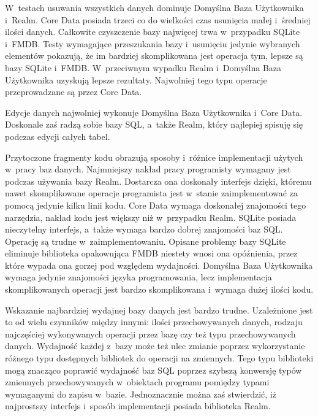  W~testach usuwania wszystkich danych dominuje Domyślna Baza Użytkownika i~Realm. Core Data posiada trzeci co do wielkości czas usunięcia małej i~średniej ilości danych. Całkowite czyszczenie bazy najwięcej trwa w~przypadku SQLite i~FMDB.  Testy wymagające przeszukania bazy i~usunięciu jedynie wybranych elementów pokazują, że im bardziej skomplikowana jest operacja tym, lepsze są bazy SQLite i~FMDB. W~przeciwnym wypadku Realm i~Domyślna Baza Użytkownika uzyskują lepsze rezultaty. Najwolniej tego typu operacje przeprowadzane są przez Core Data. 

Edycje danych najwolniej wykonuje Domyślna Baza Użytkownika i~Core Data. Doskonale zaś radzą sobie bazy SQL, a~także Realm, który najlepiej spisuję się podczas edycji całych tabel. 

Przytoczone fragmenty kodu obrazują sposoby i~różnice implementacji użytych w~pracy baz danych. Najmniejszy nakład pracy programisty wymagany jest podczas używania bazy Realm. Dostarcza ona doskonały interfejs dzięki, któremu nawet skomplikowane operacje programista jest w~stanie zaimplementować za pomocą jedynie kilku linii kodu. Core Data wymaga doskonałej znajomości tego narzędzia, nakład kodu jest większy niż w~przypadku Realm. SQLite posiada nieczytelny interfejs, a~także wymaga bardzo dobrej znajomości baz SQL. Operację są trudne w~zaimplementowaniu. Opisane problemy bazy SQLite eliminuje biblioteka opakowująca FMDB niestety wnosi ona opóźnienia, przez które wypada ona gorzej pod względem wydajności. Domyślna Baza Użytkownika wymaga jedynie znajomości języka programowania, lecz implementacja skomplikowanych operacji jest bardzo skomplikowana i~wymaga dużej ilości kodu. 

Wskazanie najbardziej wydajnej bazy danych jest bardzo trudne. Uzależnione jest to od wielu czynników między innymi: ilości przechowywanych danych, rodzaju najczęściej wykonywanych operacji przez bazę czy też typu przechowywanych danych. Wydajność każdej z~bazy może też ulec zmianie poprzez wykorzystanie różnego typu dostępnych bibliotek do operacji na zmiennych. Tego typu biblioteki mogą znacząco poprawić wydajność baz SQL poprzez szybszą konwersję typów zmiennych przechowywanych w~obiektach programu pomiędzy typami wymaganymi do zapisu w~bazie. Jednoznacznie można zaś stwierdzić, iż najprostszy interfejs i~sposób implementacji posiada biblioteka Realm.